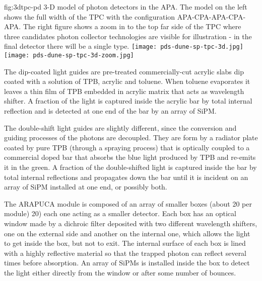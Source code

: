 \begin{dunefigure}{fig:3dtpc-pd}
{3-D model of photon detectors in the APA. The model on the left shows the full width of the TPC with the configuration APA-CPA-APA-CPA-APA. The right figure shows a zoom in to the top far side of the TPC where three candidates photon collector technologies are visible for illustration - in the final detector there will be a single type.}
\texttt{[image: pds-dune-sp-tpc-3d.jpg]}
\texttt{[image: pds-dune-sp-tpc-3d-zoom.jpg]}
\end{dunefigure}


The dip-coated light guides are pre-treated commercially-cut acrylic slabs dip 
coated with a solution of TPB, acrylic and toluene. When toluene evaporates it 
leaves a thin film of TPB embedded in  acrylic matrix that acts as wavelength 
shifter. A fraction of the light is captured inside the acrylic bar by total 
internal reflection and is detected at one end of the bar by an array of SiPM.

The double-shift light guides are slightly different, since the conversion and 
guiding processes of the photons are decoupled. They are form by a 
radiator plate coated by pure TPB (through a spraying process) that is 
optically coupled to a commercial doped bar that absorbs the blue
light produced by TPB and re-emits it in the green. A fraction of the double-shifted light is 
captured inside the bar by total internal reflections and propagates down the bar until it is incident on an
array of SiPM installed at one end, or possibly both.

The ARAPUCA module is composed of an array of smaller boxes (about 20 per module) 
20) each one acting as a smaller detector. Each box has an optical window made 
by a dichroic filter deposited with two different wavelength shifters, one on 
the external side and another on the internal one, which allows the light to get
inside the box, but not to exit. The internal surface of each box is lined 
with a highly reflective material so that the trapped photon can reflect several 
times before absorption. An array of SiPMs is installed inside the box to detect the light either directly from the window or after some number of bounces. 

